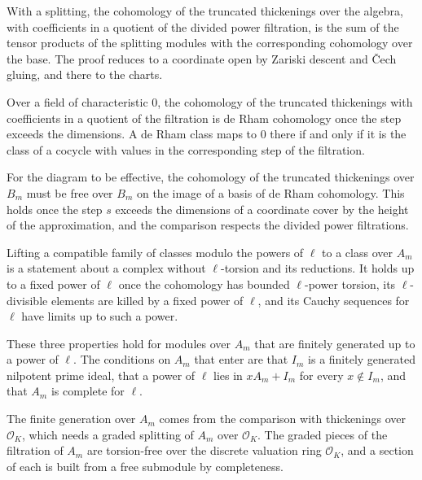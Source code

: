 With a splitting, the cohomology of the truncated thickenings over the algebra, with coefficients in a quotient of the
divided power filtration, is the sum of the tensor products of the splitting modules with the corresponding cohomology
over the base. The proof reduces to a coordinate open by Zariski descent and \v{C}ech gluing, and there to the charts.

Over a field of characteristic $0$, the cohomology of the truncated thickenings with coefficients in a quotient of the
filtration is de Rham cohomology once the step exceeds the dimensions. A de Rham class maps to $0$ there if and only if
it is the class of a cocycle with values in the corresponding step of the filtration.

For the diagram to be effective, the cohomology of the truncated thickenings over $B_m$ must be free over $B_m$ on the
image of a basis of de Rham cohomology. This holds once the step $s$ exceeds the dimensions of a coordinate cover by the
height of the approximation, and the comparison respects the divided power filtrations.

Lifting a compatible family of classes modulo the powers of $\ell$ to a class over $A_m$ is a statement about a complex
without $\ell$-torsion and its reductions. It holds up to a fixed power of $\ell$ once the cohomology has bounded
$\ell$-power torsion, its $\ell$-divisible elements are killed by a fixed power of $\ell$, and its Cauchy sequences for
$\ell$ have limits up to such a power.

These three properties hold for modules over $A_m$ that are finitely generated up to a power of $\ell$. The conditions
on $A_m$ that enter are that $I_m$ is a finitely generated nilpotent prime ideal, that a power of $\ell$ lies in
$xA_m+I_m$ for every $x\notin I_m$, and that $A_m$ is complete for $\ell$.

The finite generation over $A_m$ comes from the comparison with thickenings over $\mathcal O_K$, which needs a graded
splitting of $A_m$ over $\mathcal O_K$. The graded pieces of the filtration of $A_m$ are torsion-free over the discrete
valuation ring $\mathcal O_K$, and a section of each is built from a free submodule by completeness.

